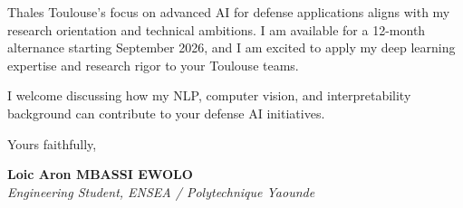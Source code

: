 \documentclass[a4paper,11pt]{article}
\begin{document}
Thales Toulouse's focus on advanced AI for defense applications aligns with my research orientation and technical ambitions. I am available for a 12-month alternance starting September 2026, and I am excited to apply my deep learning expertise and research rigor to your Toulouse teams.

I welcome discussing how my NLP, computer vision, and interpretability background can contribute to your defense AI initiatives.

Yours faithfully,

\vspace{0.8cm}

\textbf{Loic Aron MBASSI EWOLO}\\
\textit{Engineering Student, ENSEA / Polytechnique Yaounde}
\end{document}
